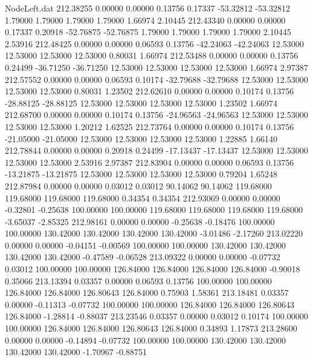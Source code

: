 \begin{filecontents}{NodeLeft.dat}
 212.38255    0.00000    0.00000     0.13756    0.17337  -53.32812  -53.32812    1.79000    1.79000    1.79000    1.79000    1.66974    2.10445
 212.43340    0.00000    0.00000     0.17337    0.20918  -52.76875  -52.76875    1.79000    1.79000    1.79000    1.79000    2.10445    2.53916
 212.48425    0.00000    0.00000     0.06593    0.13756  -42.24063  -42.24063   12.53000   12.53000   12.53000   12.53000    0.80031    1.66974
 212.53488    0.00000    0.00000     0.13756    0.24499  -36.71250  -36.71250   12.53000   12.53000   12.53000   12.53000    1.66974    2.97387
 212.57552    0.00000    0.00000     0.06593    0.10174  -32.79688  -32.79688   12.53000   12.53000   12.53000   12.53000    0.80031    1.23502
 212.62610    0.00000    0.00000     0.10174    0.13756  -28.88125  -28.88125   12.53000   12.53000   12.53000   12.53000    1.23502    1.66974
 212.68700    0.00000    0.00000     0.10174    0.13756  -24.96563  -24.96563   12.53000   12.53000   12.53000   12.53000    1.20212    1.62525
 212.73764    0.00000    0.00000     0.10174    0.13756  -21.05000  -21.05000   12.53000   12.53000   12.53000   12.53000    1.22885    1.66140
 212.78844    0.00000    0.00000     0.20918    0.24499  -17.13437  -17.13437   12.53000   12.53000   12.53000   12.53000    2.53916    2.97387
 212.83904    0.00000    0.00000     0.06593    0.13756  -13.21875  -13.21875   12.53000   12.53000   12.53000   12.53000    0.79204    1.65248
 212.87984    0.00000    0.00000     0.03012    0.03012   90.14062   90.14062  119.68000  119.68000  119.68000  119.68000    0.34354    0.34354
 212.93069    0.00000    0.00000    -0.32801   -0.25638  100.00000  100.00000  119.68000  119.68000  119.68000  119.68000   -3.65037   -2.85325
 212.98161    0.00000    0.00000    -0.25638   -0.18476  100.00000  100.00000  130.42000  130.42000  130.42000  130.42000   -3.01486   -2.17260
 213.02220    0.00000    0.00000    -0.04151   -0.00569  100.00000  100.00000  130.42000  130.42000  130.42000  130.42000   -0.47589   -0.06528
 213.09322    0.00000    0.00000    -0.07732    0.03012  100.00000  100.00000  126.84000  126.84000  126.84000  126.84000   -0.90018    0.35066
 213.13394    0.03357    0.00000     0.06593    0.13756  100.00000  100.00000  126.84000  126.84000  126.80643  126.84000    0.75903    1.58361
 213.18481    0.03357    0.00000    -0.11313   -0.07732  100.00000  100.00000  126.84000  126.84000  126.80643  126.84000   -1.28814   -0.88037
 213.23546    0.03357    0.00000     0.03012    0.10174  100.00000  100.00000  126.84000  126.84000  126.80643  126.84000    0.34893    1.17873
 213.28600    0.00000    0.00000    -0.14894   -0.07732  100.00000  100.00000  130.42000  130.42000  130.42000  130.42000   -1.70967   -0.88751

\end{filecontents}
